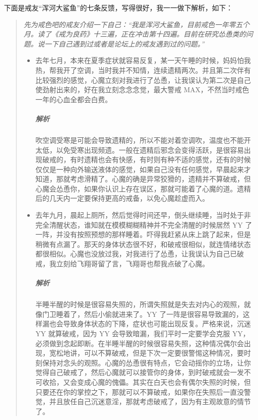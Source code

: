 下面是戒友“浑河大鲨鱼”的七条反馈，写得很好，我一一做下解析，如下：

\begin{quotation}\it
    先为戒色吧的戒友介绍一下自己：“我是浑河大鲨鱼，目前戒色一年零五个月。读了《戒为良药》十三遍，正在冲击第十四遍。目前在研究怂恿类的问题。说一下自己遇到过或者是论坛上的戒友遇到过的问题。”

    \begin{itemize}
        \item 去年七月，本来在夏季症状就容易反复，某一天午睡的时候，妈妈怕我热，帮我开了空调，当时我并不知情，连续遗精两次。并且第二次伴有比较强烈的感觉，心魔立刻对我进行了怂恿，让我误认为第二次是自己使劲射出来的，好在我立刻念念念觉，最大警戒 MAX，不然当时戒色一年的心血全都会白费。\subparagraph{解析} 吹空调受寒是可能会导致遗精的，所以不能对着空调吹，温度也不能开太低，以免受寒出现频遗。一般在遗精后邪念会变得活跃，是很容易出现破戒的，有时遗精也会有快感，有时则有种不适的感觉，还有的时候仅仅是一种向外输送液体的感觉，如果自己没有任何感觉，早晨起来才知道，那就考虑滑精了。心魔的确是异常狡猾的，遗精并不算破戒，但心魔会怂恿你，如果你认识上存在误区，那就可能着了心魔的道。遗精后的几天内一定要保持更高的戒备，以免心魔趁虚而入。
        \item 去年九月，晨起上厕所，然后觉得时间还早，倒头继续睡，当时处于非完全清醒状态，谁知就在模模糊糊精神并不完全清醒的时候居然 YY 了一阵，并没有按照预想的那样睡着。吓得我赶紧从床上跳了起来，但是稍微有点漏了。那天的身体状态很不好，和破戒很相似，就连情绪状态都很相似。心魔也没放过我，对我进行了怂恿，让我误认为自己已破戒，我立刻给飞翔哥留了言，飞翔哥也帮我点破了心魔。\subparagraph{解析} 半睡半醒的时候是很容易失照的，所谓失照就是失去对内心的观照，就像门卫睡着了，然后小偷就进来了。YY 了一阵是很容易导致漏的，这样漏也会导致身体状态的下降，症状也可能出现反复。严格来说，沉迷 YY 就算破戒，因为 YY 会导致暗漏，我们平时一定要学会克服 YY，必须做到念起即断。在半睡半醒的时候很容易失照，这种情况偶尔会出现，宽松地讲，可以不算破戒，但是下次一定要很警惕这种情况，要时刻保持对念头的观照。心魔的怂恿很有特点，它会动摇你的立场，让你觉得自己破戒了，然后心魔就可以接管你的身体，到时破戒就会一发不可收拾，又会变成心魔的傀儡。其实在白天也会有偶尔失照的时候，但只要还在你的掌控之下，那就可以不算破戒，如果你在失照后一直没警觉，并且放任自己沉迷意淫，那就考虑破戒了，因为有主观故意的情节了。

\end{itemize}
\end{quotation}
